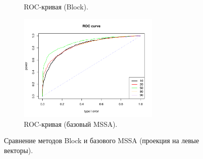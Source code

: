 \documentclass[specialist,
substylefile = spbu_report.rtx,
subf,href,colorlinks=true, 12pt]{disser}
\theoremstyle{definition}
\begin{document}
\begin{figure}
\begin{subfigure}[t]{0.45\textwidth}
			\caption{ROC-кривая (Block).}
		\end{subfigure}\hspace{\fill}
		\begin{subfigure}[t]{0.45\textwidth}
			\centering
			\includegraphics[width=0.75\textwidth]{roc_mssa_ev.pdf}
			\caption{ROC-кривая (базовый MSSA).}
		\end{subfigure}
		\caption{Сравнение методов Block и базового MSSA (проекция на левые векторы).}
		\label{fig:block_ev}
	\end{figure}
\end{document}
